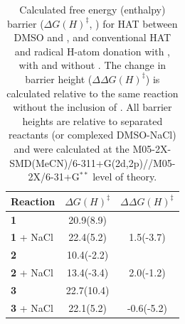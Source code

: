 \begin{doublespace}
\begin{table}[!htbp]
\caption[Calculated free energy (enthalpy) barrier for HAT between DMSO and
\cumo, and conventional HAT and radical H-atom donation with \bno, with and
without .]{Calculated free energy (enthalpy) barrier ($\Delta
G(H)^\ddagger$, \kcalmol) for HAT between DMSO and \cumo, and conventional HAT
and radical H-atom donation with \bno, with and without . The change in
barrier height ($\Delta \Delta G(H)^\ddagger$) is calculated relative to the
same reaction without the inclusion of . All barrier heights are
relative to separated reactants (or complexed DMSO-NaCl) and were calculated at
the M05-2X-SMD(MeCN)/6-311+G(2d,2p)//M05-2X/6-31+G$^{**}$ level of theory.}
\label{tab:dmso-dG}
\begin{tabular}{l c c}
Reaction    &  $\Delta G(H)^\ddagger$ &  $\Delta \Delta G(H)^\ddagger$ \\
\hline
\textbf{1}  & 20.9(8.9)  &              \\
\textbf{1} + NaCl & 22.4(5.2)  &  1.5(-3.7)   \\
\textbf{2}    & 10.4(-2.2) &              \\
\textbf{2} + NaCl & 13.4(-3.4) &  2.0(-1.2) \\
\textbf{3} & 22.7(10.4) &                  \\
\textbf{3} + NaCl & 22.1(5.2) & -0.6(-5.2)
\end{tabular}
\end{table}

\begin{figure}[!htbp]
  \setcounter{subfigure}{0}
  \centering


\end{figure}
\end{doublespace}
